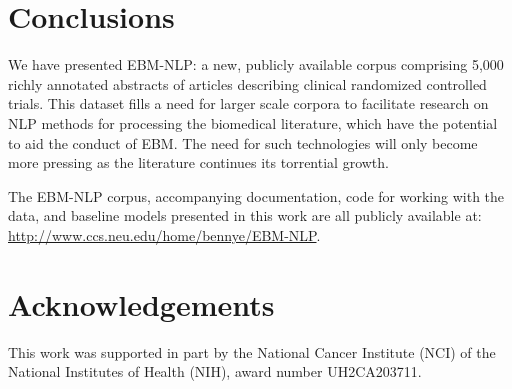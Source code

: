 \documentclass[11pt,a4paper]{article}
\begin{document}
\section{Conclusions}
\label{section:conclusions}

We have presented EBM-NLP: a new, publicly available corpus comprising 5,000 richly annotated abstracts of articles describing clinical randomized controlled trials. This dataset fills a need for larger scale corpora to facilitate research on NLP methods for processing the biomedical literature, which have the potential to aid the conduct of EBM. The need for such technologies will only become more pressing as the literature continues its torrential growth.  

The EBM-NLP corpus, accompanying documentation, code for working with the data, and baseline models presented in this work are all publicly available at: \url{http://www.ccs.neu.edu/home/bennye/EBM-NLP}. %


\section{Acknowledgements}

This work was supported in part by the National
Cancer Institute (NCI) of the National Institutes of
Health (NIH), award number UH2CA203711. 



\end{document}

